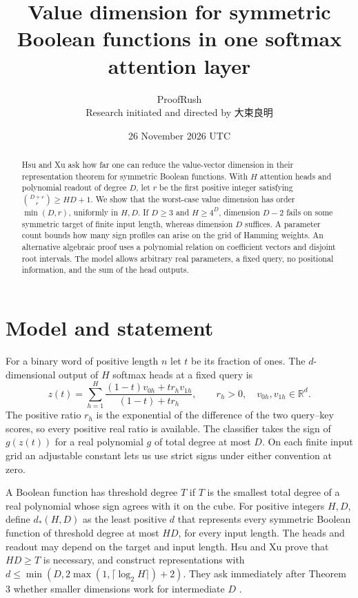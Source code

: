 \documentclass[11pt]{article}
\title{Value dimension for symmetric Boolean functions in one softmax attention layer}
\author{ProofRush\\[2pt]\small Research initiated and directed by {\namefont 大束良明}}
\date{26 November 2026 UTC}
\newcommand{\R}{\mathbb R}
\newcommand{\ds}{d_\ast}
\begin{document}
\maketitle
\begin{abstract}
Hsu and Xu ask how far one can reduce the value-vector dimension in their representation theorem for symmetric Boolean functions. With $H$ attention heads and polynomial readout of degree $D$, let $r$ be the first positive integer satisfying $\binom{D+r}{r}\ge HD+1$. We show that the worst-case value dimension has order $\min(D,r)$, uniformly in $H,D$. If $D\ge3$ and $H\ge4^D$, dimension $D-2$ fails on some symmetric target of finite input length, whereas dimension $D$ suffices. A parameter count bounds how many sign profiles can arise on the grid of Hamming weights. An alternative algebraic proof uses a polynomial relation on coefficient vectors and disjoint root intervals. The model allows arbitrary real parameters, a fixed query, no positional information, and the sum of the head outputs.
\end{abstract}

\section{Model and statement}
For a binary word of positive length $n$ let $t$ be its fraction of ones. The $d$-dimensional output of $H$ softmax heads at a fixed query is
\[
 z(t)=\sum_{h=1}^H\frac{(1-t)v_{0h}+t r_h v_{1h}}{(1-t)+t r_h},\qquad
 r_h>0,\quad v_{0h},v_{1h}\in\R^d.
\]
The positive ratio $r_h$ is the exponential of the difference of the two query--key scores, so every positive real ratio is available. The classifier takes the sign of $g(z(t))$ for a real polynomial $g$ of total degree at most $D$. On each finite input grid an adjustable constant lets us use strict signs under either convention at zero.

A Boolean function has threshold degree $T$ if $T$ is the smallest total degree of a real polynomial whose sign agrees with it on the cube. For positive integers $H,D$, define $\ds(H,D)$ as the least positive $d$ that represents every symmetric Boolean function of threshold degree at most $HD$, for every input length. The heads and readout may depend on the target and input length. Hsu and Xu prove that $HD\ge T$ is necessary, and construct representations with $d\le\min(D,2\max(1,\lceil\log_2 H\rceil)+2)$. They ask immediately after Theorem 3 whether smaller dimensions work for intermediate $D$ \cite{hsuxu}.
\end{document}
